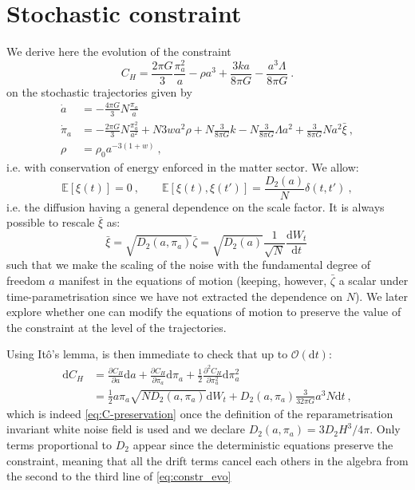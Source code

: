\documentclass[amsmath,amssymb,11pt]{article}
\begin{document}
\section{Stochastic constraint}\label{app:constraint}
We derive here the evolution of the constraint
\begin{equation}
    C_H= \frac{2 \pi G}{3} \frac{\pi_a^2}{a}-\rho a^3 + \frac{3 k a}{8\pi G}- \frac{a^3 \Lambda}{8\pi G}\ .
\end{equation}
on the stochastic trajectories given by
\begin{align}
    \dot{a} &= -\frac{4\pi G}{3} N \frac{\pi_a}{a} \\
    \dot{\pi}_a &= - \frac{2 \pi G}{3} N\frac{\pi_a^2}{a^2}+N 3 wa^2 \rho + N \frac{3}{8\pi G} k - N\frac{3}{8\pi G} \Lambda a^2+ \frac{3}{8\pi G}N a^2 \bar{\xi} \ , \\
    \rho &= \rho_0 a^{-3(1+w)} \ ,
\end{align}
i.e. with conservation of energy enforced in the matter sector. We allow:
\begin{equation}
    \mathbb{E}[\xi(t)]=0 \ , \qquad \mathbb{E}[\xi(t), \xi(t')]=\frac{D_2(a)}{N}\delta(t,t') \ ,
\end{equation}
i.e. the diffusion having a general dependence on the scale factor. It is always possible to rescale $\bar{\xi}$ as:
\begin{equation}
    \bar{\xi} = \sqrt{D_2(a,\pi_a)} \bar{\zeta} = \sqrt{D_2(a)} \frac{1}{\sqrt{N}} \frac{\text{d}W_t}{\text{d}t} \,
\end{equation}
such that we make the scaling of the noise with the fundamental degree of freedom $a$ manifest in the equations of motion (keeping, however, $\bar{\zeta}$ a scalar under time-parametrisation since we have not extracted the dependence on $N$). We later explore whether one can modify the equations of motion to preserve the value of the constraint at the level of the trajectories.

Using It\^{o}'s lemma, is then immediate to check that up to $\mathcal{O}(\text{d}t)$:
\begin{equation}
\begin{split}
\label{eq:constr_evo}
    \text{d}C_H &= \frac{\partial C_H}{\partial a} \text{d}a +  \frac{\partial C_H}{\partial \pi_a} \text{d} \pi_a + \frac{1}{2} \frac{\partial^2 C_H}{\partial \pi_a^2}  \text{d}\pi_a^2 \\
    &= \frac{1}{2}  a \pi_a \sqrt{N D_2(a,\pi_a)}\text{d}W_t+D_2(a,\pi_a) \frac{3}{32\pi G} a^3 N\text{d}t  \ ,
\end{split}
\end{equation}
which is indeed \eqref{eq:C-preservation} once the definition of the reparametrisation invariant white noise field is used and we declare $D_2(a,\pi_a) = 3 D_2 H^3/4\pi$. Only terms proportional to $D_2$ appear since the deterministic equations preserve the constraint, meaning that all the drift terms cancel each others in the algebra from the second to the third line of \eqref{eq:constr_evo}
\end{document}
